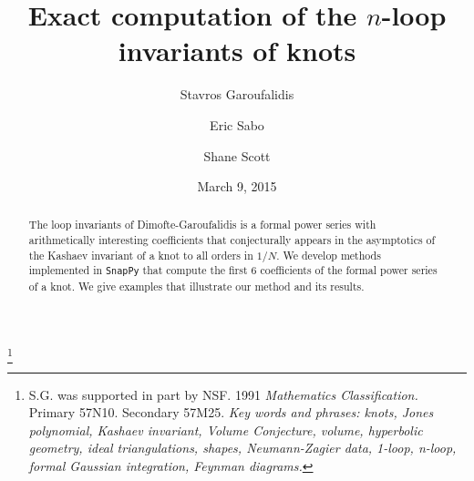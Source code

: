 \documentclass[12pt]{amsart}
\theoremstyle{definition}
\begin{document}

\title[Exact computation of the $n$-loop invariants of knots]{
Exact computation of the $n$-loop invariants of knots}

\author{Stavros Garoufalidis}
\address{School of Mathematics \\
         Georgia Institute of Technology \\
         Atlanta, GA 30332-0160, USA \newline
         {\tt \url{http://www.math.gatech.edu/~stavros }}}
\author{Eric Sabo}
\address{School of Mathematics \\
         Georgia Institute of Technology \\
         Atlanta, GA 30332-0160, USA \newline
         {\tt \url{http://www.math.gatech.edu/users/esabo3 }}}
\author{Shane Scott}
\address{School of Mathematics \\
         Georgia Institute of Technology \\
         Atlanta, GA 30332-0160, USA \newline
         {\tt \url{http://www.math.gatech.edu/users/sscott42 }}}
\thanks{
S.G. was supported in part by NSF.
1991 {\em Mathematics Classification.} Primary 57N10. Secondary 57M25.
\newline
{\em Key words and phrases: knots, Jones polynomial, Kashaev invariant,
Volume Conjecture, volume, hyperbolic geometry, ideal triangulations,
shapes, Neumann-Zagier data, 1-loop, n-loop, formal Gaussian integration,
Feynman diagrams.}
}

\date{March 9, 2015}%


\begin{abstract}
The loop invariants of Dimofte-Garoufalidis is a formal power series with
arithmetically interesting coefficients that conjecturally appears
in the asymptotics of the Kashaev invariant of a knot to all orders in $1/N$.
We develop methods implemented in \texttt{SnapPy} that compute the first 6 
coefficients of the formal power series of a knot. We give examples that
illustrate our method and its results.
\end{abstract}

\maketitle
\end{document}
